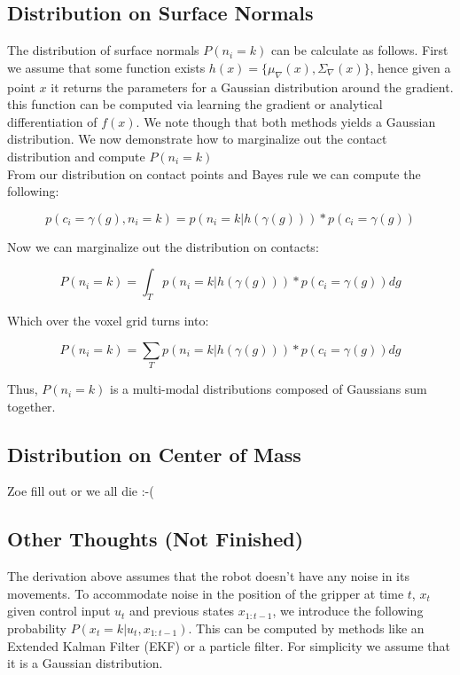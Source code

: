 \documentclass[letterpaper, 10 pt, conference]{ieeeconf}  %
\begin{document}
\subsection{Distribution on Surface Normals} The distribution of surface normals $P(n_i = k)$ can be calculate as follows. First we assume that some function exists $h(x) = \lbrace \mu_{\nabla}(x), \Sigma_{\nabla}(x) \rbrace$, hence given a point $x$ it returns the parameters for a Gaussian distribution around the gradient. this function can be computed via learning the gradient \cite{gradient} or analytical differentiation of $f(x)$. We note though that both methods yields a Gaussian distribution. We now demonstrate how to marginalize out the contact distribution and compute $P(n_i = k)$\\

From our distribution on contact points and Bayes rule we can compute the following: 

\begin{equation}
p(c_i = \gamma(g), n_i = k) = p(n_i = k | h(\gamma(g)))*p(c_i = \gamma(g))
\end{equation}

Now we can marginalize out the distribution on contacts:

\begin{equation}
P(n_i = k) = \int_T  p(n_i = k | h(\gamma(g)))*p(c_i = \gamma(g)) dg
\end{equation}

Which over the voxel grid turns into: 

\begin{equation}
P(n_i = k) = \sum_T  p(n_i = k | h(\gamma(g)))*p(c_i = \gamma(g)) dg
\end{equation}


Thus, $P(n_i = k)$ is a multi-modal distributions  composed of Gaussians sum together. 

\subsection{Distribution on Center of Mass} Zoe fill out or we all die :-(


\subsection{Other Thoughts (Not Finished)}
The derivation above assumes that the robot doesn't have any noise in its movements. To accommodate noise in the position of the gripper at time $t$, $x_t$ given control input $u_{t}$ and previous states $x_{1:t-1}$, we introduce the following probability $P(x_t=k|u_t,x_{1:t-1})$. This can be computed by methods like an Extended Kalman Filter (EKF) or a particle filter. For simplicity we assume that it is a Gaussian distribution. 
\end{document}
